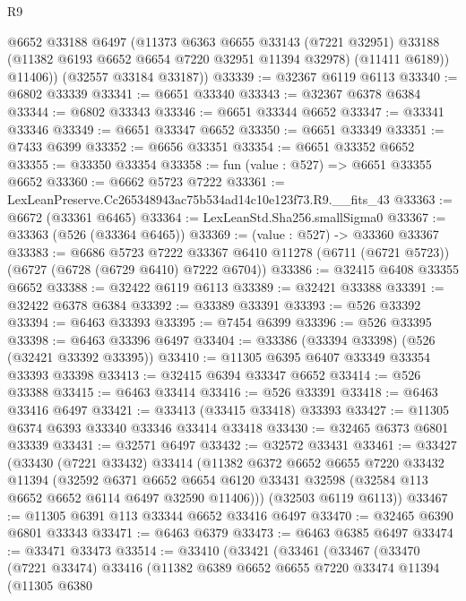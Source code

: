 \begin{lexlean}{R9}
\begin{coremodule}
          @6652
          @33188
          @6497
          (@11373
            @6363
            @6655
            @33143
            (@7221 @32951)
            @33188
            (@11382 @6193 @6652 @6654 @7220 @32951 @11394 @32978)
            (@11411 @6189))
          @11406))
      (@32557 @33184 @33187))
@33339 := @32367 @6119 @6113
@33340 := @6802 @33339
@33341 := @6651 @33340
@33343 := @32367 @6378 @6384
@33344 := @6802 @33343
@33346 := @6651 @33344 @6652
@33347 := @33341 @33346
@33349 := @6651 @33347 @6652
@33350 := @6651 @33349
@33351 := @7433 @6399
@33352 := @6656 @33351
@33354 := @6651 @33352 @6652
@33355 := @33350 @33354
@33358 := fun (value : @527) => @6651 @33355 @6652
@33360 := @6662 @5723 @7222
@33361 := LexLeanPreserve.Cc265348943ac75b534ad14c10e123f73.R9.__fits_43
@33363 := @6672 (@33361 @6465)
@33364 := LexLeanStd.Sha256.smallSigma0
@33367 := @33363 (@526 (@33364 @6465))
@33369 := (value : @527) -> @33360 @33367
@33383 := @6686
    @5723
    @7222
    @33367
    @6410
    @11278
    (@6711 (@6721 @5723))
    (@6727 (@6728 (@6729 @6410) @7222 @6704))
@33386 := @32415 @6408 @33355 @6652
@33388 := @32422 @6119 @6113
@33389 := @32421 @33388
@33391 := @32422 @6378 @6384
@33392 := @33389 @33391
@33393 := @526 @33392
@33394 := @6463 @33393
@33395 := @7454 @6399
@33396 := @526 @33395
@33398 := @6463 @33396 @6497
@33404 := @33386 (@33394 @33398) (@526 (@32421 @33392 @33395))
@33410 := @11305 @6395 @6407 @33349 @33354 @33393 @33398
@33413 := @32415 @6394 @33347 @6652
@33414 := @526 @33388
@33415 := @6463 @33414
@33416 := @526 @33391
@33418 := @6463 @33416 @6497
@33421 := @33413 (@33415 @33418) @33393
@33427 := @11305 @6374 @6393 @33340 @33346 @33414 @33418
@33430 := @32465 @6373 @6801 @33339
@33431 := @32571 @6497
@33432 := @32572 @33431
@33461 := @33427
    (@33430
      (@7221 @33432)
      @33414
      (@11382
        @6372
        @6652
        @6655
        @7220
        @33432
        @11394
        (@32592
          @6371
          @6652
          @6654
          @6120
          @33431
          @32598
          (@32584 @113 @6652 @6652 @6114 @6497 @32590 @11406)))
      (@32503 @6119 @6113))
@33467 := @11305 @6391 @113 @33344 @6652 @33416 @6497
@33470 := @32465 @6390 @6801 @33343
@33471 := @6463 @6379
@33473 := @6463 @6385 @6497
@33474 := @33471 @33473
@33514 := @33410
    (@33421
      (@33461
        (@33467
          (@33470
            (@7221 @33474)
            @33416
            (@11382
              @6389
              @6652
              @6655
              @7220
              @33474
              @11394
              (@11305
                @6380

\end{coremodule}
\end{lexlean}
